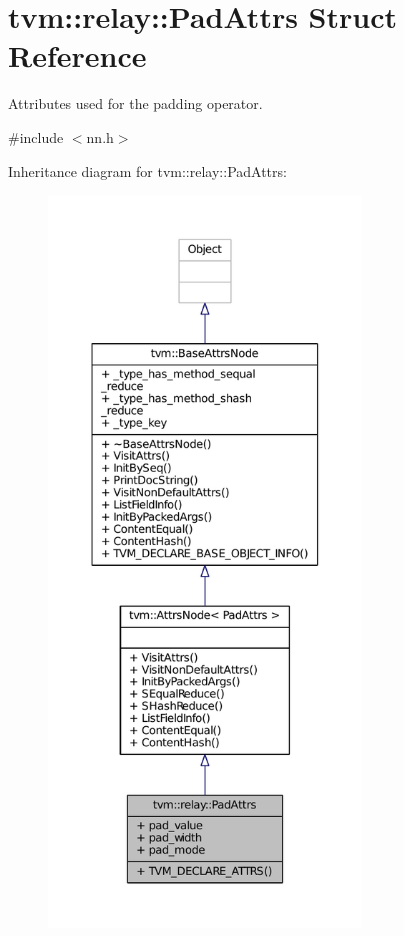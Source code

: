 \hypertarget{structtvm_1_1relay_1_1PadAttrs}{}\section{tvm\+:\+:relay\+:\+:Pad\+Attrs Struct Reference}
\label{structtvm_1_1relay_1_1PadAttrs}


Attributes used for the padding operator.  




{\ttfamily \#include $<$nn.\+h$>$}



Inheritance diagram for tvm\+:\+:relay\+:\+:Pad\+Attrs\+:
\nopagebreak
\begin{figure}[H]
\begin{center}
\leavevmode
\includegraphics[height=550pt]{structtvm_1_1relay_1_1PadAttrs__inherit__graph}
\end{center}
\end{figure}


